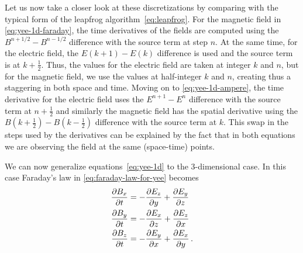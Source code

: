 \documentclass[12pt, class=report, crop=false]{standalone}
\begin{document}
Let us now take a closer look at these discretizations by comparing with the typical form of the leapfrog
algorithm~\eqref{eq:leapfrog}.
For the magnetic field in \cref{eq:yee-1d-faraday}, the time derivatives of the fields are
computed using the \(B^{n+1/2} - B^{n-1/2}\) difference with the source term at step \(n\).
At the same time, for the electric field, the \(E(k+1)-E(k)\) difference is used and the source
term is at \(k+\frac{1}{2}\). Thus, the values for the electric
field are taken at integer \(k\) and \(n\), but for the magnetic
field, we use the values at half-integer \(k\) and \(n\), creating
thus a staggering in both space and time. Moving on to  \cref{eq:yee-1d-ampere},
the time derivative for the electric field uses the \(E^{n+1}-E^n\)
difference with the source term at \(n+\frac{1}{2}\) and similarly
the magnetic field has the spatial derivative using the \(B(k+\frac{1}{2}) - B(k-\frac{1}{2})\) difference with the source
term at \(k\). This swap in the steps used by the derivatives can
be explained by the fact that in both equations we are observing
the field at the same (space-time) points.

We can now generalize equations~\eqref{eq:yee-1d} to the 3-dimensional case.
In this case Faraday's law in \cref{eq:faraday-law-for-yee} becomes
\begin{align*}
  \pdv{B_x}{t} &= -\pdv{E_z}{y} + \pdv{E_y}{z} \\
  \pdv{B_y}{t} &= -\pdv{E_x}{z} + \pdv{E_z}{x} \\
  \pdv{B_z}{t} &= -\pdv{E_y}{x} + \pdv{E_x}{y} \,.
\end{align*}
\end{document}
